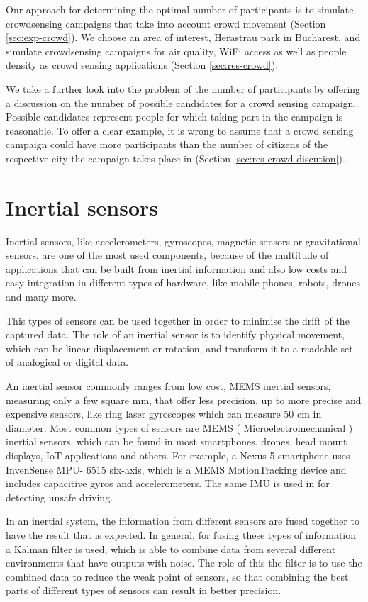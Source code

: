 Our approach for determining the optimal number of participants is to simulate crowdsensing campaigns that take into account crowd movement (Section \ref{sec:exp-crowd}). We choose an area of interest, Herastrau park in Bucharest, and simulate crowdsensing campaigns for air quality, WiFi access as well as people density as crowd sensing applications (Section \ref{sec:res-crowd}).

We take a further look into the problem of the number of participants by offering a discussion on the number of possible candidates for a crowd sensing campaign. Possible candidates represent people for which taking part in the campaign is reasonable. To offer a clear example, it is wrong to assume that a crowd sensing campaign could have more participants than the number of citizens of the respective city the campaign takes place in (Section \ref{sec:res-crowd-discution}).


\section{Inertial sensors}
\label{sec:intro-acc}

Inertial sensors, like accelerometers, gyroscopes, magnetic sensors or gravitational sensors, are one of the most used components,
because of the multitude of applications that can be built from
inertial information and also low costs and easy integration in different
types of hardware, like mobile phones, robots, drones and
many more.

This types of sensors can be used together in order to minimise the drift of the captured data. 
The role of an inertial sensor is to identify physical
movement, which can be linear displacement or rotation, and
transform it to a readable set of analogical or digital data.

An inertial sensor commonly ranges from low cost, MEMS inertial
sensors, measuring only a few square mm, that offer less
precision, up to more precise and expensive sensors, like ring
laser gyroscopes which can measure 50 cm in diameter.  Most
common types of sensors are MEMS ( Microelectromechanical ) inertial sensors, which can be found in most smartphones,
drones, head mount displays, IoT applications and others.
For example, a Nexus 5 smartphone uses InvenSense MPU-
6515 six-axis, which is a MEMS MotionTracking device and
includes capacitive gyros and accelerometers. The same IMU
is used in \cite{Liu-2015} for detecting unsafe driving. 

In an inertial system, the information from different sensors
are fused together to have the result that is expected. In
general, for fusing these types of information a Kalman filter
is used, which is able to combine data from several different
environments that have outputs with noise. The role of this
the filter is to use the combined data to reduce the weak point of
sensors, so that combining the best parts of different types of
sensors can result in better precision.

